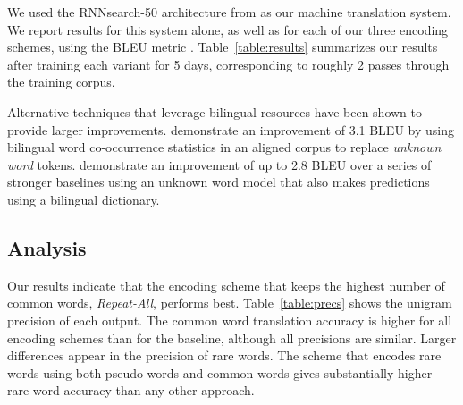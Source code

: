 We used the RNNsearch-50 architecture from 
as our machine translation system. We report results for this system alone, as
well as for each of our three encoding schemes, using the BLEU metric
\cite{bleu}. Table~\ref{table:results} summarizes our results after training
each variant for 5 days, corresponding to roughly 2 passes through the
training corpus.

Alternative techniques that leverage bilingual resources have been shown to
provide larger improvements.  demonstrate an
improvement of 3.1 BLEU by using bilingual word co-occurrence statistics in an
aligned corpus to replace \emph{unknown word} tokens.
 demonstrate an improvement of up to 2.8
BLEU over a series of stronger baselines using an unknown word model that
also makes predictions using a bilingual dictionary.

\subsection{Analysis}

\begin{table}
  \centering
  \vspace{8pt}
  \caption{Test set precision (\%) on common words and rare words for each
  encoding strategy. \emph{1st Symbol} denotes the precision of the first
  pseudo-word symbol in an encoded rare word.}
  \label{table:precs}
\end{table}

Our results indicate that the encoding scheme that keeps the highest number of
common words, \emph{Repeat-All}, performs best. Table~\ref{table:precs} shows
the unigram precision of each output. The common word translation accuracy is
higher for all encoding schemes than for the baseline, although all precisions
are similar. Larger differences appear in the precision of rare words. The
scheme that encodes rare words using both pseudo-words and common words gives
substantially higher rare word accuracy than any other approach.

